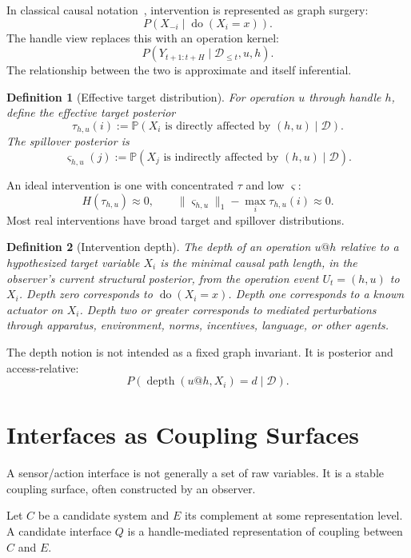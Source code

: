 \documentclass[11pt]{article}
\newtheorem{definition}{Definition}
\newcommand{\D}{\mathcal D}
\newcommand{\Prob}{\mathbb P}
\newcommand{\doop}{\operatorname{do}}
\begin{document}
In classical causal notation~\cite{pearl2009causality}, intervention is represented as graph surgery:
\[
    P(X_{-i}\mid \doop(X_i=x)).
\]
The handle view replaces this with an operation kernel:
\[
    P(Y_{t+1:t+H}\mid \D_{\le t},u,h).
\]
The relationship between the two is approximate and itself inferential.

\begin{definition}[Effective target distribution]
For operation $u$ through handle $h$, define the effective target posterior
\[
    \tau_{h,u}(i)
    :=
    \Prob\!\left(
        X_i \text{ is directly affected by }(h,u)
        \mid \D
    \right).
\]
The spillover posterior is
\[
    \varsigma_{h,u}(j)
    :=
    \Prob\!\left(
        X_j \text{ is indirectly affected by }(h,u)
        \mid \D
    \right).
\]
\end{definition}

An ideal intervention is one with concentrated $\tau$ and low $\varsigma$:
\[
    H(\tau_{h,u})\approx 0,
    \qquad
    \|\varsigma_{h,u}\|_1-\max_i\tau_{h,u}(i)\approx0.
\]
Most real interventions have broad target and spillover distributions.

\begin{definition}[Intervention depth]
The depth of an operation $u@h$ relative to a hypothesized target variable $X_i$
is the minimal causal path length, in the observer's current structural posterior,
from the operation event $U_t=(h,u)$ to $X_i$.
Depth zero corresponds to $\doop(X_i=x)$. Depth one corresponds to a known
actuator on $X_i$. Depth two or greater corresponds to mediated perturbations
through apparatus, environment, norms, incentives, language, or other agents.
\end{definition}

The depth notion is not intended as a fixed graph invariant. It is posterior and
access-relative:
\[
    P(\operatorname{depth}(u@h,X_i)=d\mid \D).
\]

\section{Interfaces as Coupling Surfaces}

A sensor/action interface is not generally a set of raw variables. It is a stable
coupling surface, often constructed by an observer.

Let $C$ be a candidate system and $E$ its complement at some representation
level. A candidate interface $Q$ is a handle-mediated representation of coupling
between $C$ and $E$.
\end{document}
